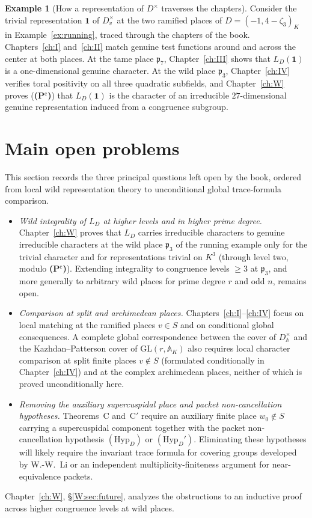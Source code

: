 \documentclass[12pt,letterpaper,oneside]{book}
\theoremstyle{plain}
\theoremstyle{definition}
\newtheorem{example}[theorem]{Example}
\newcommand{\Pctag}{\textnormal{\textbf{(P$^{\mathrm c}$)}}}
\begin{document}
\begin{example}[How a representation of $D^\times$ traverses the chapters]\label{ex:intro-pipeline}
Consider the trivial representation $\mathbf 1$ of $D_v^\times$ at the two ramified places of $D=(-1,4-\zeta_3)_K$ in Example~\ref{ex:running}, traced through the chapters of the book. Chapters~\ref{ch:I} and~\ref{ch:II} match genuine test functions around and across the center at both places. At the tame place $\mathfrak p_7$, Chapter~\ref{ch:III} shows that $L_D(\mathbf 1)$ is a one-dimensional genuine character. At the wild place $\mathfrak p_3$, Chapter~\ref{ch:IV} verifies toral positivity on all three quadratic subfields, and Chapter~\ref{ch:W} proves (\Pctag) that $L_D(\mathbf 1)$ is the character of an irreducible $27$-dimensional genuine representation induced from a congruence subgroup.
\end{example}

\section{Main open problems}\label{sec:open}
This section records the three principal questions left open by the book, ordered from local wild representation theory to unconditional global trace-formula comparison.
\begin{itemize}[leftmargin=*]
\item \emph{Wild integrality of $L_D$ at higher levels and in higher prime degree.} Chapter~\ref{ch:W} proves that $L_D$ carries irreducible characters to genuine irreducible characters at the wild place $\mathfrak p_3$ of the running example only for the trivial character and for representations trivial on $K^3$ (through level two, modulo \Pctag). Extending integrality to congruence levels $\ge 3$ at $\mathfrak p_3$, and more generally to arbitrary wild places for prime degree $r$ and odd $n$, remains open.
\item \emph{Comparison at split and archimedean places.} Chapters~\ref{ch:I}--\ref{ch:IV} focus on local matching at the ramified places $v\in S$ and on conditional global consequences. A complete global correspondence between the cover of $D^\times_{\mathbb A}$ and the Kazhdan--Patterson cover of $\mathrm{GL}(r,\mathbb A_K)$ also requires local character comparison at split finite places $v\notin S$ (formulated conditionally in Chapter~\ref{ch:IV}) and at the complex archimedean places, neither of which is proved unconditionally here.
\item \emph{Removing the auxiliary supercuspidal place and packet non-cancellation hypotheses.} Theorems~C and~C$'$ require an auxiliary finite place $w_0\notin S$ carrying a supercuspidal component together with the packet non-cancellation hypothesis $(\mathrm{Hyp}_D)$ or $(\mathrm{Hyp}_D')$. Eliminating these hypotheses will likely require the invariant trace formula for covering groups developed by W.-W.~Li \cite{Li10,Li12,Li14} or an independent multiplicity-finiteness argument for near-equivalence packets.
\end{itemize}
Chapter~\ref{ch:W}, \S\ref{W:sec:future}, analyzes the obstructions to an inductive proof across higher congruence levels at wild places.
\end{document}
